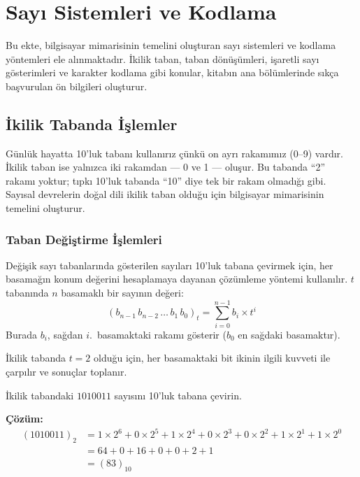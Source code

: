 \chapter{Sayı Sistemleri ve Kodlama}
\label{ch:sayi-sistemleri}

Bu ekte, bilgisayar mimarisinin temelini oluşturan sayı sistemleri ve kodlama yöntemleri ele alınmaktadır. İkilik taban, taban dönüşümleri, işaretli sayı gösterimleri ve karakter kodlama gibi konular, kitabın ana bölümlerinde sıkça başvurulan ön bilgileri oluşturur.

\section{İkilik Tabanda İşlemler}
\label{sec:ikilik-taban}

Günlük hayatta 10'luk tabanı kullanırız çünkü on ayrı rakamımız (0--9) vardır. İkilik taban ise yalnızca iki rakamdan --- 0 ve 1 --- oluşur. Bu tabanda ``2'' rakamı yoktur; tıpkı 10'luk tabanda ``10'' diye tek bir rakam olmadığı gibi. Sayısal devrelerin doğal dili ikilik taban olduğu için bilgisayar mimarisinin temelini oluşturur.

\subsection{Taban Değiştirme İşlemleri}

Değişik sayı tabanlarında gösterilen sayıları 10'luk tabana çevirmek için, her basamağın konum değerini hesaplamaya dayanan çözümleme yöntemi kullanılır. $t$ tabanında $n$ basamaklı bir sayının değeri:
\begin{equation}
(b_{n-1}\, b_{n-2}\, \ldots\, b_1\, b_0)_t = \sum_{i=0}^{n-1} b_i \times t^i
\label{eq:taban-donusum}
\end{equation}
Burada $b_i$, sağdan $i$.~basamaktaki rakamı gösterir ($b_0$ en sağdaki basamaktır).

İkilik tabanda $t = 2$ olduğu için, her basamaktaki bit ikinin ilgili kuvveti ile çarpılır ve sonuçlar toplanır.

\begin{ornek}[A.1]
İkilik tabandaki $1010011$ sayısını 10'luk tabana çevirin.

\textbf{Çözüm:}
\begin{align*}
(1010011)_2 &= 1\times 2^6 + 0\times 2^5 + 1\times 2^4 + 0\times 2^3 + 0\times 2^2 + 1\times 2^1 + 1\times 2^0 \\
&= 64 + 0 + 16 + 0 + 0 + 2 + 1 \\
&= (83)_{10}
\end{align*}
\end{ornek}

